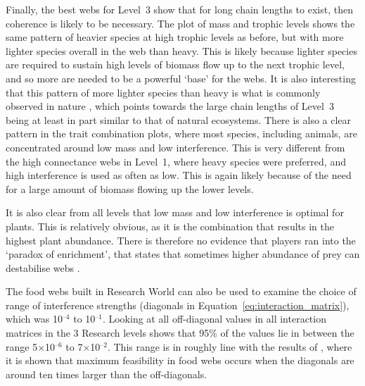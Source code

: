 Finally, the best webs for Level~3 show that for long chain lengths to exist, then coherence is likely to be necessary. The plot of mass and trophic levels shows the same pattern of heavier species at high trophic levels as before, but with more lighter species overall in the web than heavy. This is likely because lighter species are required to sustain high levels of biomass flow up to the next trophic level, and so more are needed to be a powerful `base' for the webs.
It is also interesting that this pattern of more lighter species than heavy is what is commonly observed in nature \citep{Fenchel1993}, which points towards the large chain lengths of Level~3 being at least in part similar to that of natural ecosystems.
There is also a clear pattern in the trait combination plots, where most species, including animals, are concentrated around low mass and low interference. This is very different from the high connectance webs in Level~1, where heavy species were preferred, and high interference is used as often as low. This is again likely because of the need for a large amount of biomass flowing up the lower levels.

It is also clear from all levels that low mass and low interference is optimal for plants. This is relatively obvious, as it is the combination that results in the highest plant abundance. There is therefore no evidence that players ran into the `paradox of enrichment', that states that sometimes higher abundance of prey can destabilise webs \citep{Rosenzweig1971}.

The food webs built in Research World can also be used to examine the choice of range of interference strengths (diagonals in Equation~\eqref{eq:interaction_matrix}), which was 10$^{\text{--}4}$ to 10$^{\text{--}1}$. Looking at all off-diagonal values in all interaction matrices in the 3 Research levels shows that 95\% of the values lie in between the range 5$\times$10$^{\text{--}6}$ to 7$\times$10$^{\text{--}2}$. 
This range is in roughly line with the results of \citet{Ho2020}, where it is shown that maximum feasibility in food webs occurs when the diagonals are around ten times larger than the off-diagonals.

